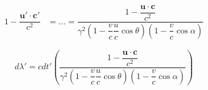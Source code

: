 \begin{equation}
	\begin{aligned}
		1 - \dfrac{\mathbf{u}' \cdot \mathbf{c}'}{c^2} &= ...
		= \dfrac{  1 - \dfrac{\mathbf{u}\cdot\mathbf{c}}{c^2}  }
		{ \gamma^2 \left(1-\dfrac{v}{c}\dfrac{u}{c}\cos\theta \right) \left(1-\dfrac{v}{c}\cos\alpha \right)}
	\end{aligned}
\end{equation}

\begin{equation}
	d\lambda' = c dt' \left( \dfrac{  1 - \dfrac{\mathbf{u}\cdot\mathbf{c}}{c^2}  }
	{ \gamma^2 \left(1-\dfrac{v}{c}\dfrac{u}{c}\cos\theta \right) \left(1-\dfrac{v}{c}\cos\alpha \right)} \right)
\end{equation}

